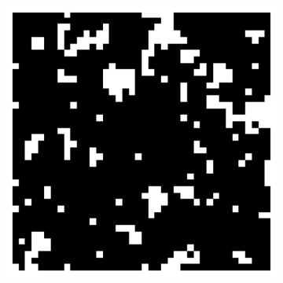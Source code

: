 \documentclass[11pt, a4paper]{report} %
\begin{document}
\begin{figure}[htb]
\begin{subfigure}[c]{0.2\linewidth}
	\end{subfigure}
	~
	\begin{subfigure}[c]{0.2\linewidth}
		\includegraphics[width=\linewidth]{20160603125613_40_by_40_Lattice_step20.pdf}
	\end{subfigure}


\end{figure}
\end{document}
